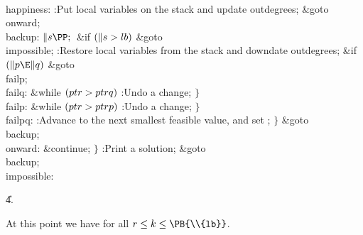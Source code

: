\4\\{happiness}:\5
:Put local variables on the stack and update outdegrees\X;\6
\&{goto} \\{onward};\6
\4\\{backup}:\5
${}\|s\PP;{}$\6
\&{if} ${}(\|s>\\{lb}){}$\1\5
\&{goto} \\{impossible};\2\6
:Restore local variables from the stack and downdate outdegrees\X;\6
\&{if} ${}(\|p\E\|q){}$\1\5
\&{goto} \\{failp};\2\6
\4\\{failq}:\5
\&{while} ${}(\\{ptr}>\\{ptrq}){}$\1\5
:Undo a change\X;\2\6
\4${}\}{}$\2\6
\4\\{failp}:\5
\&{while} ${}(\\{ptr}>\\{ptrp}){}$\1\5
:Undo a change\X;\2\6
\4${}\}{}$\2\6
\4\\{failpq}:\5
:Advance  to the next smallest feasible value, and set \X;\6
\4${}\}{}$\2\6
\&{goto} \\{backup};\6
\4\\{onward}:\5
\&{continue};\6
\4${}\}{}$\2\6
:Print a solution\X;\6
\&{goto} \\{backup};\6
\4\\{impossible}:\par
\U4.\fi

At this point we have  for all $r\le k\le\PB{%
\\{lb}}$.

